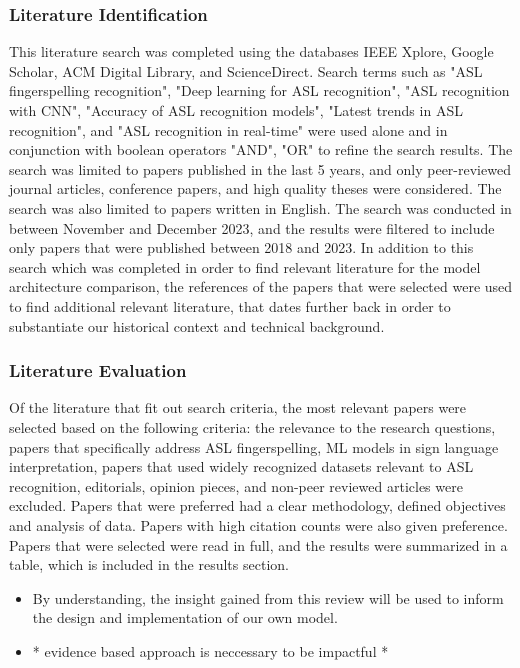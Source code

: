 \subsubsection{Literature Identification}
This literature search was completed using the databases IEEE Xplore, Google Scholar, ACM Digital Library, and ScienceDirect. Search terms such as "ASL fingerspelling recognition", "Deep learning for ASL recognition",  "ASL recognition with CNN", "Accuracy of ASL recognition models", "Latest trends in ASL recognition", and "ASL recognition in real-time" were used alone and in conjunction with boolean operators "AND", "OR" to refine the search results. The search was limited to papers published in the last 5 years, and only peer-reviewed journal articles, conference papers, and high quality theses were considered. The search was also limited to papers written in English. The search was conducted in between November and December 2023, and the results were filtered to include only papers that were published between 2018 and 2023.
In addition to this search which was completed in order to find relevant literature for the model architecture comparison, the references of the papers that were selected were used to find additional relevant literature, that dates further back in order to substantiate our historical context and technical background.
\subsubsection{Literature Evaluation}
Of the literature that fit out search criteria, the most relevant papers were selected based on the following criteria: the relevance to the research questions, papers that specifically address ASL fingerspelling, ML models in sign language interpretation, papers that used widely recognized datasets relevant to ASL recognition, editorials, opinion pieces, and non-peer reviewed articles were excluded. Papers that were preferred had a clear methodology, defined objectives and analysis of data. Papers with high citation counts were also given preference. Papers that were selected were read in full, and the results were summarized in a table, which is included in the results section.

\begin{itemize}
    \item By understanding, the insight gained from this review will be used to inform the design and implementation of our own model.
    \item * evidence based approach is neccessary to be impactful *

\end{itemize}

